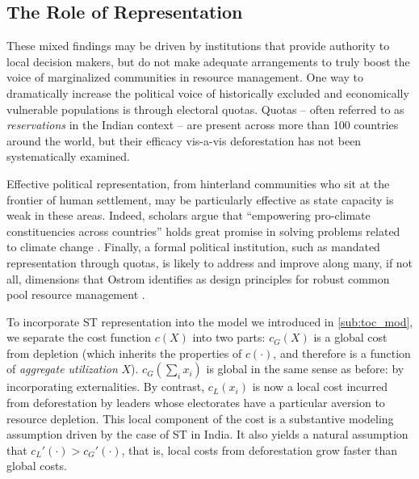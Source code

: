 \documentclass[12pt,reqno]{article}
\begin{document}


\subsection{The Role of Representation}

These mixed findings may be driven by institutions that provide authority to local decision makers, but do not make adequate arrangements to truly boost the voice of marginalized communities in resource management. One way to dramatically increase the political voice of historically excluded and economically vulnerable populations is through electoral quotas. Quotas -- often referred to as {\it reservations} in the Indian context -- are present across more than 100 countries around the world, but their efficacy vis-a-vis deforestation has not been systematically examined. %

Effective political representation, from hinterland communities who sit at the frontier of human settlement, may be particularly effective as state capacity is weak in these areas. Indeed, scholars argue that ``empowering pro-climate constituencies across countries'' holds great promise in solving problems related to climate change \parencite[6]{aklin2018prisoners}. Finally, a formal political institution, such as mandated representation through quotas, is likely to address and improve along many, if not all, dimensions that Ostrom identifies as design principles for robust common pool resource management \parencite[90]{ostrom1990governing}. %

To incorporate ST representation into the model we introduced in \ref{sub:toc_mod}, we separate the cost function $c(X)$ into two parts: $c_G(X)$ is a global cost from depletion (which inherits the properties of $c(\cdot)$, and therefore is a function of \textit{aggregate utilization} $X$). $c_G(\sum_i x_i)$ is global in the same sense as before: by incorporating externalities. By contrast, $c_L(x_i)$ is now a local cost incurred from deforestation by leaders whose electorates have a particular aversion to resource depletion. This local component of the cost is a substantive modeling assumption driven by the case of ST in India. It also yields a natural assumption that $c_L'(\cdot) > c_G'(\cdot)$, that is, local costs from deforestation grow faster than global costs. 
\end{document}

